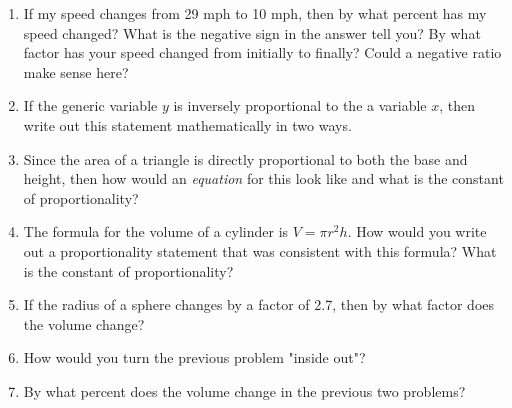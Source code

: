 \begin{enumerate}
\item If my speed changes from 29 mph to 10 mph, then by what percent has my speed changed? What is the negative sign in the answer tell you? By what factor has your speed changed from initially to finally? Could a negative ratio make sense here?\\

\item If the generic variable $y$ is inversely proportional to the a variable $x$, then write out this statement mathematically in two ways.\\

\item Since the area of a triangle is directly proportional to both the base and height, then how would an \emph{equation} for this look like and what is the constant of proportionality?\\

\item The formula for the volume of a cylinder is $V=\pi r^2 h$. How would you write out a proportionality statement that was consistent with this formula? What is the constant of proportionality?\\

\item If the radius of a sphere changes by a factor of 2.7, then by what factor does the volume change?\\

\item How would you turn the previous problem "inside out"? 

\item By what percent does the volume change in the previous two problems?
	
\end{enumerate}